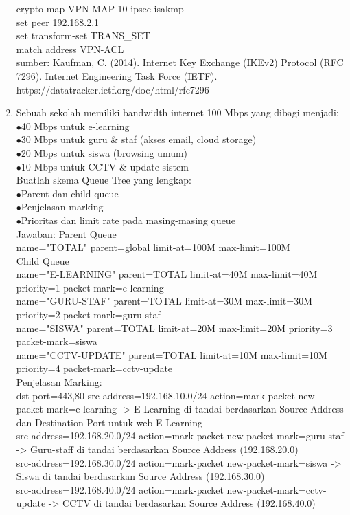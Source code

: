 \begin{enumerate}
	crypto map VPN-MAP 10 ipsec-isakmp\\
	set peer 192.168.2.1\\
	set transform-set TRANS\_SET\\
	match address VPN-ACL\\
	sumber: Kaufman, C. (2014). Internet Key Exchange (IKEv2) Protocol (RFC 7296). Internet Engineering Task Force (IETF). https://datatracker.ietf.org/doc/html/rfc7296
	\item Sebuah sekolah memiliki bandwidth internet 100 Mbps yang dibagi menjadi:\\
	$\bullet$40 Mbps untuk e-learning\\
	$\bullet$30 Mbps untuk guru \& staf (akses email, cloud storage)\\
	$\bullet$20 Mbps untuk siswa (browsing umum)\\
	$\bullet$10 Mbps untuk CCTV \& update sistem\\
	Buatlah skema Queue Tree yang lengkap:\\
	$\bullet$Parent dan child queue\\
	$\bullet$Penjelasan marking\\
	$\bullet$Prioritas dan limit rate pada masing-masing queue\\
	Jawaban: Parent Queue\\
	name="TOTAL" parent=global limit-at=100M max-limit=100M\\
	Child Queue\\
	name="E-LEARNING" parent=TOTAL limit-at=40M max-limit=40M priority=1 packet-mark=e-learning\\
	name="GURU-STAF" parent=TOTAL limit-at=30M max-limit=30M priority=2 packet-mark=guru-staf\\
	name="SISWA" parent=TOTAL limit-at=20M max-limit=20M priority=3 packet-mark=siswa\\
	name="CCTV-UPDATE" parent=TOTAL limit-at=10M max-limit=10M priority=4 packet-mark=cctv-update\\
	Penjelasan Marking:\\
	dst-port=443,80 src-address=192.168.10.0/24 action=mark-packet new-packet-mark=e-learning -> E-Learning di tandai berdasarkan Source Address dan Destination Port untuk web E-Learning\\
	src-address=192.168.20.0/24 action=mark-packet new-packet-mark=guru-staf -> Guru-staff di tandai berdasarkan Source Address (192.168.20.0)\\
	src-address=192.168.30.0/24 action=mark-packet new-packet-mark=siswa -> Siswa di tandai berdasarkan Source Address (192.168.30.0)\\
	src-address=192.168.40.0/24 action=mark-packet new-packet-mark=cctv-update -> CCTV di tandai berdasarkan Source Address (192.168.40.0)\\
	

\end{enumerate}
